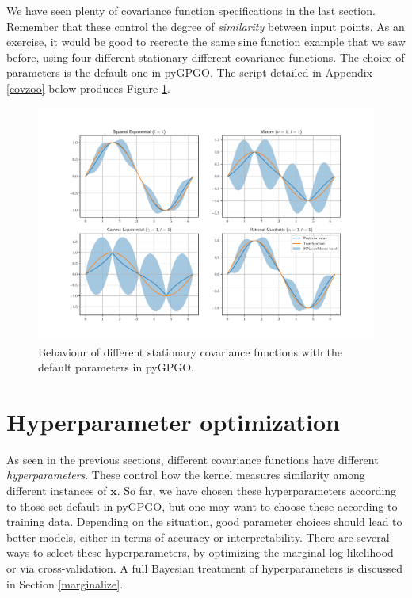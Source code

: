 \documentclass[10pt,a4paper,twoside]{book}
\begin{document}
We have seen plenty of covariance function specifications in the last section. Remember that these control the degree of \textit{similarity} between input points. As an exercise, it would be good to recreate the same sine function example that we saw before, using four different stationary different covariance functions. The choice of parameters is the default one in pyGPGO. The script detailed in Appendix \ref{covzoo} below produces Figure \ref{fig:zoo}. \\


\begin{figure}
\caption{Behaviour of different stationary covariance functions with the default parameters in pyGPGO.}
\label{fig:zoo}
\includegraphics[width=\textwidth]{figures/chapter2/zoo}
\end{figure}

\section{Hyperparameter optimization}
\label{hyper}

As seen in the previous sections, different covariance functions have different \textit{hyperparameters}. These control how the kernel measures similarity among different instances of $\boldsymbol{x}$. So far, we have chosen these hyperparameters according to those set default in pyGPGO, but one may want to choose these according to training data. Depending on the situation, good parameter choices should lead to better models, either in terms of accuracy or interpretability. There are several ways to select these hyperparameters, by optimizing the marginal log-likelihood or via cross-validation. A full Bayesian treatment of hyperparameters is discussed in Section \ref{marginalize}.
\end{document}
